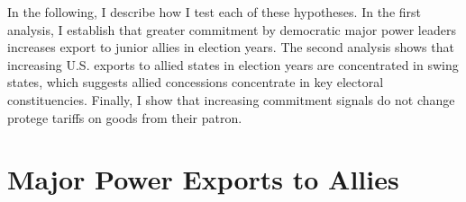 \documentclass[12pt]{article}
\begin{document}
%
%
%
%


In the following, I describe how I test each of these hypotheses. 
In the first analysis, I establish that greater commitment by democratic major power leaders increases export to junior allies in election years. 
The second analysis shows that increasing U.S. exports to allied states in election years are concentrated in swing states, which suggests allied concessions concentrate in key electoral constituencies.
Finally, I show that increasing commitment signals do not change protege tariffs on goods from their patron.



\section{Major Power Exports to Allies}
\end{document}
